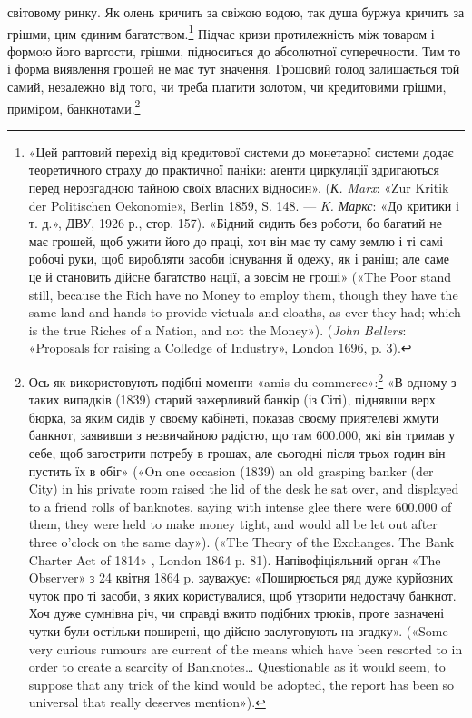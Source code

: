 \parcont{}  %
світовому ринку. Як олень кричить за свіжою водою, так душа буржуа кричить за грішми, цим єдиним
багатством.\footnote{
«Цей раптовий перехід від кредитової системи до монетарної системи додає теоретичного страху до
практичної паніки: аґенти циркуляції здригаються перед нерозгадною тайною своїх власних відносин».
(\emph{К. Marx}: «Zur Kritik der Politischen Oekonomie», Berlin 1859, S. 148. — \emph{K. Маркс}: «До критики і т.
д.», ДВУ, 1926 р., стор. 157). «Бідний сидить без роботи, бо багатий не має грошей, щоб ужити його
до праці, хоч він має ту саму землю і ті самі робочі руки, щоб виробляти засоби існування й одежу,
як і раніш; але саме це й становить дійсне багатство нації, а зовсім не гроші» («The Poor stand
still, because the Rich have no Money to employ them, though they have the same land and hands to
provide victuals and cloaths, as ever they had; which is the true Riches of a Nation, and not the
Money»). (\emph{John Bellers}: «Proposals for raising a Colledge of
Industry», London 1696, p. 3).
} Підчас кризи протилежність між товаром і формою його вартости, грішми, підноситься до
абсолютної суперечности. Тим то і форма виявлення грошей не має тут значення. Грошовий голод
залишається той самий, незалежно від того, чи треба платити золотом, чи кредитовими грішми,
приміром, банкнотами.\footnote{
Ось як використовують подібні моменти «amis du commerce»:\footnote*{
— друзі торговлі. \emph{Ред.}
} «В одному з таких випадків (1839)
старий зажерливий банкір (із Сіті), піднявши верх бюрка, за яким сидів у своєму кабінеті, показав
своєму приятелеві жмути банкнот, заявивши з незвичайною радістю, що там \num{600.000},
які він тримав у себе, щоб загострити потребу в грошах, але сьогодні після трьох годин він пустить
їх в обіг» («On one occasion (1839) an old grasping banker (der City) in his private room raised the
lid of the desk he sat over, and displayed to a friend rolls of banknotes, saying with intense glee
there were \num{600.000} of them, they were held to make money tight, and would all be let out after
three o'clock on the same day»). («The Theory of the Exchanges. The Bank Charter Act of 1814» ,
London 1864 p. 81). Напівофіціяльний орган «The Observer» з 24 квітня 1864 p. зауважує: «Поширюється
ряд дуже курйозних чуток про ті засоби, з яких користувалися, щоб утворити недостачу банкнот. Хоч
дуже сумнівна річ, чи справді вжито подібних трюків, проте зазначені чутки були остільки поширені,
що дійсно заслуговують на згадку». («Some very curious rumours are current of the means which have
been resorted to in order to create a scarcity of Banknotes\dots{} Questionable as it would seem, to
suppose that any trick of the kind would be adopted, the report has been so universal that really
deserves mention»).
}

